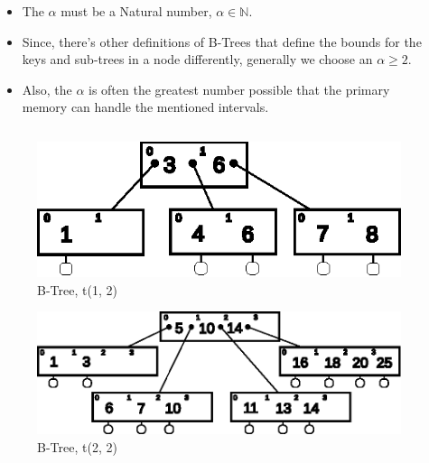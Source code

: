 \documentclass{beamer}
\begin{document}
\begin{frame}
    \begin{columns}
        \begin{column}{\textlecolumn}
            \begin{block}{}
                \begin{itemize}
                    \item The \(\alpha\) must be a Natural number, \(\alpha \in \mathbb{N}\).
                    \item Since, there's other definitions of B-Trees that define the bounds for the keys and sub-trees in a node differently, generally we choose an \(\alpha \geq 2\).
                    \item Also, the \(\alpha\) is often the greatest number possible that the primary memory can handle the mentioned intervals.
                \end{itemize}
            \end{block}
        \end{column}
        \begin{column}{\textricolumn}
        \end{column}
    \end{columns}
    
    \framebreak

    \begin{columns}
        \begin{column}{\textwidth}
            \begin{block}{}
                \begin{figure}
                    \centering
                    \includegraphics[width=0.65\linewidth,keepaspectratio]{resources/made/a2_btree.eps}
                    \caption[]{B-Tree, t(1, 2)}
                \end{figure}
                \vspace{-0.75cm}
                \begin{figure}
                    \centering
                    \includegraphics[width=0.75\linewidth,keepaspectratio]{resources/made/a3_btree.eps}
                    \caption[]{B-Tree, t(2, 2)}
                \end{figure}
            \end{block}    
        \end{column}
        \begin{column}{0pt}
        \end{column}
    \end{columns}


\end{frame}
\end{document}

